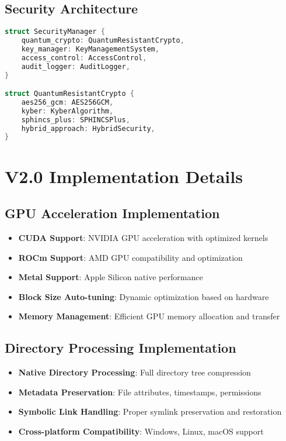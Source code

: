 \documentclass[12pt,a4paper]{article}
\begin{document}
\subsection{Security Architecture}
\begin{lstlisting}[language=Rust, caption=V2.0 Security Framework]
struct SecurityManager {
    quantum_crypto: QuantumResistantCrypto,
    key_manager: KeyManagementSystem,
    access_control: AccessControl,
    audit_logger: AuditLogger,
}

struct QuantumResistantCrypto {
    aes256_gcm: AES256GCM,
    kyber: KyberAlgorithm,
    sphincs_plus: SPHINCSPlus,
    hybrid_approach: HybridSecurity,
}
\end{lstlisting}

\section{V2.0 Implementation Details}

\subsection{GPU Acceleration Implementation}
\begin{itemize}
    \item \textbf{CUDA Support}: NVIDIA GPU acceleration with optimized kernels
    \item \textbf{ROCm Support}: AMD GPU compatibility and optimization
    \item \textbf{Metal Support}: Apple Silicon native performance
    \item \textbf{Block Size Auto-tuning}: Dynamic optimization based on hardware
    \item \textbf{Memory Management}: Efficient GPU memory allocation and transfer
\end{itemize}

\subsection{Directory Processing Implementation}
\begin{itemize}
    \item \textbf{Native Directory Processing}: Full directory tree compression
    \item \textbf{Metadata Preservation}: File attributes, timestamps, permissions
    \item \textbf{Symbolic Link Handling}: Proper symlink preservation and restoration
    \item \textbf{Cross-platform Compatibility}: Windows, Linux, macOS support
\end{itemize}
\end{document}
